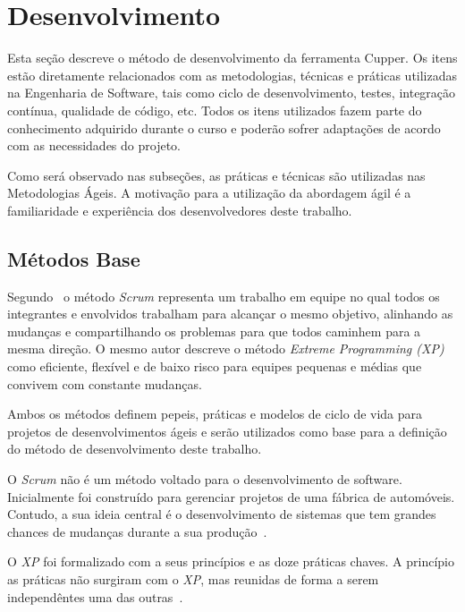 \section{Desenvolvimento}
\label{sec:desenvolvimento}

Esta seção descreve o método de desenvolvimento da ferramenta Cupper.
Os itens estão diretamente relacionados com as metodologias, técnicas e
práticas utilizadas na Engenharia de Software, tais como ciclo de
desenvolvimento, testes, integração contínua, qualidade de código, etc.
Todos os itens utilizados fazem parte do conhecimento adquirido durante
o curso e poderão sofrer adaptações de acordo com as necessidades do projeto.

Como será observado nas subseções, as práticas e técnicas são utilizadas
nas Metodologias Ágeis. A motivação para a utilização da abordagem
ágil é a familiaridade e experiência dos desenvolvedores deste trabalho.

\subsection{Métodos Base}
\label{sec:metodo_base}

Segundo~ o método \textit{Scrum} representa um trabalho
em equipe no qual todos os integrantes e envolvidos trabalham para alcançar
o mesmo objetivo, alinhando as mudanças e compartilhando os problemas para que
todos caminhem para a mesma direção. O mesmo autor descreve o método
\textit{Extreme Programming (XP)} como eficiente, flexível e de baixo risco para equipes
pequenas e médias que convivem com constante mudanças.

Ambos os métodos definem pepeis, práticas e modelos de ciclo de vida para
projetos de desenvolvimentos ágeis e serão utilizados como base para a definição
do método de desenvolvimento deste trabalho.

O \textit{Scrum} não é um método voltado para o desenvolvimento de software. Inicialmente
foi construído para gerenciar projetos de uma fábrica de automóveis.
Contudo, a sua ideia central é o desenvolvimento de sistemas que tem grandes
chances de mudanças durante a sua produção~\cite{fadel:2010}.

O \textit{XP} foi formalizado com a seus princípios e as doze práticas chaves. A princípio
as práticas não surgiram com o \textit{XP}, mas reunidas de forma a serem independêntes uma
das outras~\cite{fadel:2010}.


